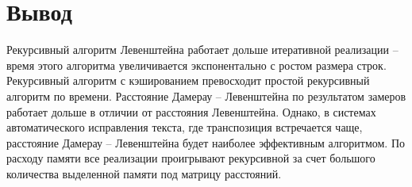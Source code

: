 \clearpage 
\section{Вывод}
Рекурсивный алгоритм Левенштейна работает дольше итеративной реализации -- время этого алгоритма увеличивается экспонентально с ростом размера строк.
Рекурсивный алгоритм с кэшированием превосходит простой рекурсивный алгоритм по времени. 
Расстояние Дамерау -- Левенштейна по результатом замеров работает дольше в отличии от расстояния Левенштейна. Однако, в системах автоматического исправления текста, где транспозиция встречается чаще, расстояние Дамерау -- Левенштейна будет наиболее эффективным алгоритмом. 
По расходу памяти все реализации проигрывают рекурсивной за счет большого количества выделенной памяти под матрицу расстояний.


